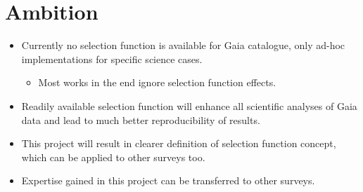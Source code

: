 \section{Ambition}
\label{sec:ambition}

\begin{itemize}
    \item Currently no selection function is available for Gaia catalogue, only ad-hoc implementations for specific
        science cases.
        \begin{itemize}
            \item Most works in the end ignore selection function effects.
        \end{itemize}
    \item Readily available selection function will enhance all scientific analyses of Gaia data and lead to much better
        reproducibility of results.
    \item This project will result in clearer definition of selection function concept, which can be applied to other
        surveys too.
    \item Expertise gained in this project can be transferred to other surveys.
\end{itemize}

